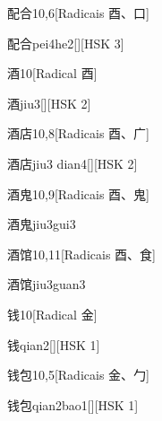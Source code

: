 \begin{entry}{配合}{10,6}[Radicais ⾣、⼝]
  \begin{phonetics}{配合}{pei4he2}[][HSK 3]
  \end{phonetics}
\end{entry}

\begin{entry}{酒}{10}[Radical ⾣]
  \begin{phonetics}{酒}{jiu3}[][HSK 2]
  \end{phonetics}
\end{entry}

\begin{entry}{酒店}{10,8}[Radicais ⾣、⼴]
  \begin{phonetics}{酒店}{jiu3 dian4}[][HSK 2]
  \end{phonetics}
\end{entry}

\begin{entry}{酒鬼}{10,9}[Radicais ⾣、⿁]
  \begin{phonetics}{酒鬼}{jiu3gui3}
  \end{phonetics}
\end{entry}

\begin{entry}{酒馆}{10,11}[Radicais ⾣、⾷]
  \begin{phonetics}{酒馆}{jiu3guan3}
  \end{phonetics}
\end{entry}

\begin{entry}{钱}{10}[Radical ⾦]
  \begin{phonetics}{钱}{qian2}[][HSK 1]
  \end{phonetics}
\end{entry}

\begin{entry}{钱包}{10,5}[Radicais ⾦、⼓]
  \begin{phonetics}{钱包}{qian2bao1}[][HSK 1]
  \end{phonetics}
\end{entry}


